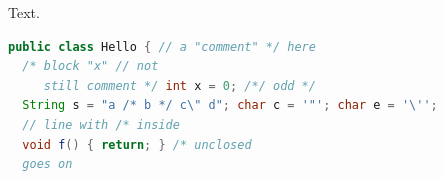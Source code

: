 \documentclass{article}
\begin{document}
Text.
\begin{lstlisting}[language=Java]
public class Hello { // a "comment" */ here
  /* block "x" // not
     still comment */ int x = 0; /*/ odd */
  String s = "a /* b */ c\" d"; char c = '"'; char e = '\'';
  // line with /* inside
  void f() { return; } /* unclosed
  goes on
\end{lstlisting}
\end{document}
